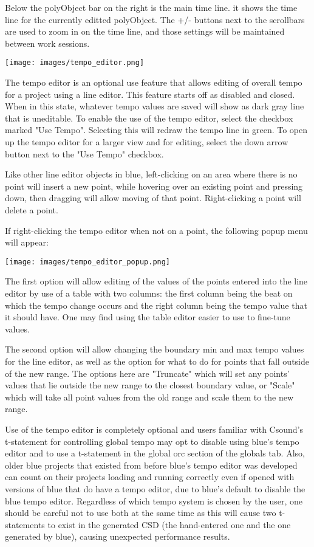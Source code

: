 Below the polyObject bar on the right is the main time line. it shows
the time line for the currently editted polyObject. The +/- buttons next
to the scrollbars are used to zoom in on the time line, and those
settings will be maintained between work sessions.

\texttt{[image: images/tempo\_editor.png]}

The tempo editor is an optional use feature that allows editing of
overall tempo for a project using a line editor. This feature starts off
as disabled and closed. When in this state, whatever tempo values are
saved will show as dark gray line that is uneditable. To enable the use
of the tempo editor, select the checkbox marked "Use Tempo". Selecting
this will redraw the tempo line in green. To open up the tempo editor
for a larger view and for editing, select the down arrow button next to
the "Use Tempo" checkbox.

Like other line editor objects in blue, left-clicking on an area where
there is no point will insert a new point, while hovering over an
existing point and pressing down, then dragging will allow moving of
that point. Right-clicking a point will delete a point.

If right-clicking the tempo editor when not on a point, the following
popup menu will appear:

\texttt{[image: images/tempo\_editor\_popup.png]}

The first option will allow editing of the values of the points entered
into the line editor by use of a table with two columns: the first
column being the beat on which the tempo change occurs and the right
column being the tempo value that it should have. One may find using the
table editor easier to use to fine-tune values.

The second option will allow changing the boundary min and max tempo
values for the line editor, as well as the option for what to do for
points that fall outside of the new range. The options here are
"Truncate" which will set any points' values that lie outside the new
range to the closest boundary value, or "Scale" which will take all
point values from the old range and scale them to the new range.

Use of the tempo editor is completely optional and users familiar with
Csound's t-statement for controlling global tempo may opt to disable
using blue's tempo editor and to use a t-statement in the global orc
section of the globals tab. Also, older blue projects that existed from
before blue's tempo editor was developed can count on their projects
loading and running correctly even if opened with versions of blue that
do have a tempo editor, due to blue's default to disable the blue tempo
editor. Regardless of which tempo system is chosen by the user, one
should be careful not to use both at the same time as this will cause
two t-statements to exist in the generated CSD (the hand-entered one and
the one generated by blue), causing unexpected performance results.

